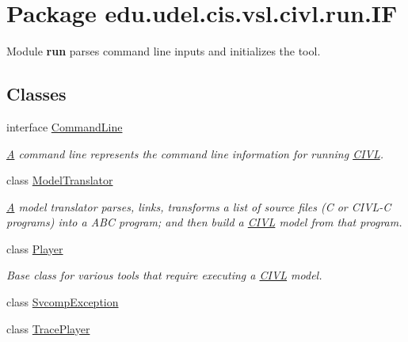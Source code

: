 \hypertarget{namespaceedu_1_1udel_1_1cis_1_1vsl_1_1civl_1_1run_1_1IF}{}\section{Package edu.\+udel.\+cis.\+vsl.\+civl.\+run.\+I\+F}
\label{namespaceedu_1_1udel_1_1cis_1_1vsl_1_1civl_1_1run_1_1IF}


Module {\bfseries run} parses command line inputs and initializes the tool.  


\subsection*{Classes}
\begin{DoxyCompactItemize}
\item 
interface \hyperlink{interfaceedu_1_1udel_1_1cis_1_1vsl_1_1civl_1_1run_1_1IF_1_1CommandLine}{Command\+Line}
\begin{DoxyCompactList}\small\item\em \hyperlink{structA}{A} command line represents the command line information for running \hyperlink{classedu_1_1udel_1_1cis_1_1vsl_1_1civl_1_1CIVL}{C\+I\+V\+L}. \end{DoxyCompactList}\item 
class \hyperlink{classedu_1_1udel_1_1cis_1_1vsl_1_1civl_1_1run_1_1IF_1_1ModelTranslator}{Model\+Translator}
\begin{DoxyCompactList}\small\item\em \hyperlink{structA}{A} model translator parses, links, transforms a list of source files (C or C\+I\+V\+L-\/\+C programs) into a A\+B\+C program; and then build a \hyperlink{classedu_1_1udel_1_1cis_1_1vsl_1_1civl_1_1CIVL}{C\+I\+V\+L} model from that program. \end{DoxyCompactList}\item 
class \hyperlink{classedu_1_1udel_1_1cis_1_1vsl_1_1civl_1_1run_1_1IF_1_1Player}{Player}
\begin{DoxyCompactList}\small\item\em Base class for various tools that require executing a \hyperlink{classedu_1_1udel_1_1cis_1_1vsl_1_1civl_1_1CIVL}{C\+I\+V\+L} model. \end{DoxyCompactList}\item 
class \hyperlink{classedu_1_1udel_1_1cis_1_1vsl_1_1civl_1_1run_1_1IF_1_1SvcompException}{Svcomp\+Exception}
\item 
class \hyperlink{classedu_1_1udel_1_1cis_1_1vsl_1_1civl_1_1run_1_1IF_1_1TracePlayer}{Trace\+Player}

\end{DoxyCompactItemize}
